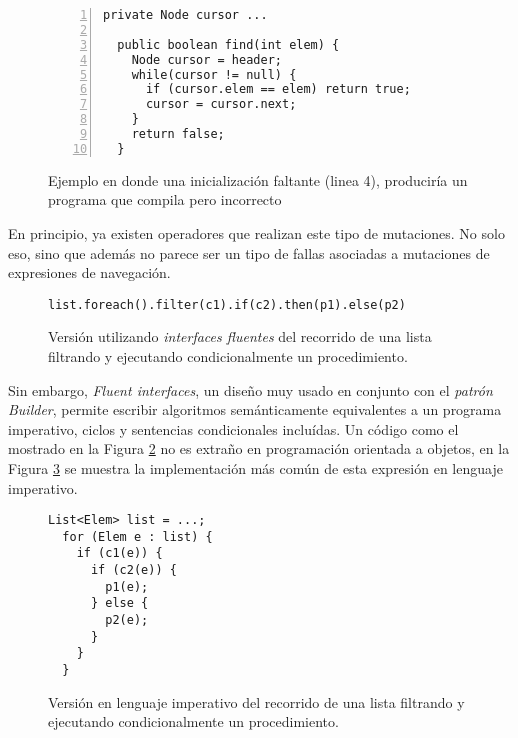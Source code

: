 \begin{figure}
	\begin{lstlisting}[frame=single, numbers=left, mathescape=true,framexleftmargin=1.5em]
  private Node cursor ...
	
  public boolean find(int elem) {
    Node cursor = header;
    while(cursor != null) {
      if (cursor.elem == elem) return true;
      cursor = cursor.next;
    }
    return false;
  }
	\end{lstlisting}
	\caption{Ejemplo en donde una inicializaci\'on faltante (linea 4), producir\'ia un programa que compila pero incorrecto}
	\label{figures.examples.localVariableHidingField}
\end{figure}

En principio, ya existen operadores que realizan este tipo de mutaciones. No solo eso, sino que adem\'as no parece ser un tipo de fallas asociadas a mutaciones de expresiones de navegaci\'on.

\begin{figure}
	\begin{lstlisting}[frame=single, mathescape=true,framexleftmargin=1.5em]
  list.foreach().filter(c1).if(c2).then(p1).else(p2)
	\end{lstlisting}
	\caption{Versi\'on utilizando \emph{interfaces fluentes} del recorrido de una lista filtrando y ejecutando condicionalmente un procedimiento.}
	\label{figures.examples.fluent.example1.fluent}
\end{figure}

Sin embargo, \emph{Fluent interfaces}, un dise\~no muy usado en conjunto con el \emph{patr\'on Builder}, permite escribir algoritmos sem\'anticamente equivalentes a un programa imperativo, ciclos y sentencias condicionales inclu\'idas. Un c\'odigo como el mostrado en la Figura \ref{figures.examples.fluent.example1.fluent} no es extra\~no en programaci\'on orientada a objetos, en la Figura \ref{figures.examples.fluent.example1.imperative} se muestra la implementaci\'on m\'as com\'un de esta expresi\'on en lenguaje imperativo.

\begin{figure}
	\begin{lstlisting}[frame=single, mathescape=true,framexleftmargin=1.5em]
  List<Elem> list = ...;
  for (Elem e : list) {
    if (c1(e)) {
      if (c2(e)) {
        p1(e);
      } else {
        p2(e);
      }
    }
  }
	\end{lstlisting}
	\caption{Versi\'on en lenguaje imperativo del recorrido de una lista filtrando y ejecutando condicionalmente un procedimiento.}
	\label{figures.examples.fluent.example1.imperative}
\end{figure}

